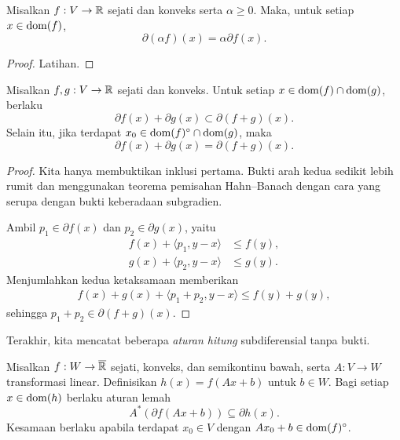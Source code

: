 \begin{theorem}
    Misalkan $f:V\rightarrow\mathbb{R}$ sejati dan konveks serta $\alpha\geq 0$. Maka, untuk setiap $x\in\operatorname{\mathrm{dom}}(f)$,
    \[
        \partial(\alpha f)(x) = \alpha\partial f(x).
    \]
\end{theorem}
\begin{proof}
    Latihan.
\end{proof}

\begin{theorem}
    Misalkan $f,g:V\rightarrow\mathbb{R}$ sejati dan konveks. Untuk setiap $x\in\operatorname{\mathrm{dom}}(f)\cap\operatorname{\mathrm{dom}}(g)$, berlaku
    \[
        \partial f(x) + \partial g(x)\subset \partial (f+g)(x).
    \]
    Selain itu, jika terdapat $x_0\in \operatorname{\mathrm{dom}}(f)^\circ \cap\operatorname{\mathrm{dom}}(g)$, maka
    \[
        \partial f(x) + \partial g(x) = \partial (f+g)(x).
    \]
\end{theorem}
\begin{proof}
    Kita hanya membuktikan inklusi pertama. Bukti arah kedua sedikit lebih rumit dan menggunakan teorema pemisahan Hahn--Banach dengan cara yang serupa dengan bukti keberadaan subgradien.

    Ambil $p_1\in \partial f(x)$ dan $p_2\in \partial g(x)$, yaitu
    \begin{equation}
        \begin{aligned}
            f(x) + \langle p_1, y-x\rangle&\leq f(y),\\
            g(x) + \langle p_2, y-x\rangle&\leq g(y).
        \end{aligned}
    \end{equation}
    Menjumlahkan kedua ketaksamaan memberikan
    \begin{equation}
        \begin{aligned}
            f(x)+ g(x) + \langle p_1+p_2, y-x\rangle \leq f(y) + g(y),
        \end{aligned}
    \end{equation}
    sehingga $p_1+p_2\in \partial(f+g)(x)$.
\end{proof}

Terakhir, kita mencatat beberapa \emph{aturan hitung} subdiferensial tanpa bukti.
\begin{theorem}
    Misalkan $f:W\rightarrow\overline{\mathbb{R}}$ sejati, konveks, dan semikontinu bawah, serta $A:V\rightarrow W$ transformasi linear. Definisikan $h(x)=f(Ax+b)$ untuk $b\in W$. Bagi setiap $x\in\operatorname{\mathrm{dom}}(h)$ berlaku aturan lemah
    \[
        A^\ast(\partial f(Ax+b))\subseteq\partial h(x).
    \]
    Kesamaan berlaku apabila terdapat $x_0\in V$ dengan $Ax_0+b\in\operatorname{\mathrm{dom}}(f)^\circ$.
\end{theorem}

